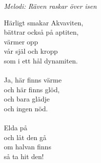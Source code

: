{\footnotesize\textit{Melodi: Räven raskar över isen}}\par
\vspace{10pt}
Härligt smakar Akvaviten,\\
bättrar också på aptiten,\\
värmer opp\\
vår själ och kropp\\
som i ett hål dynamiten.\\
\\
Ja, här finns värme\\
och här finns glöd,\\
och bara glädje\\
och ingen nöd.\\
\\
Elda på\\
och låt den gå\\
om halvan finns\\
så ta hit den!

